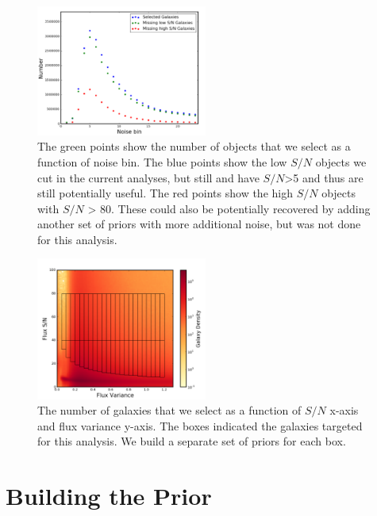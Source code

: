 \documentclass[useAMS,usenatbib]{mnras}
\begin{document}
\begin{figure}
    \includegraphics[width=0.5\textwidth]{miss_gal.png}
    \caption{
       The green points show the number of objects that we select as a function of noise bin.  The blue points show the low $S/N$ objects we cut in the current analyses, but still and have $S/N$>5 and thus are still potentially useful.  The red points show the high $S/N$ objects with  $S/N$ > 80.  These could also be potentially recovered by adding another set of priors with more additional noise, but was not done for this analysis. 
    }
    \label{fig:miss_gal}
\end{figure}

\begin{figure}
    \includegraphics[width=0.5\textwidth]{sn_var.png}
    \caption{
       The number of galaxies that we select as a function of $S/N$ x-axis and flux variance y-axis.  The boxes indicated the galaxies targeted for this analysis.  We build a separate set of priors for each box.
    }
    \label{fig:sn_var}
\end{figure}


\section{Building the Prior}
\label{Sec:Prior}
\end{document}
